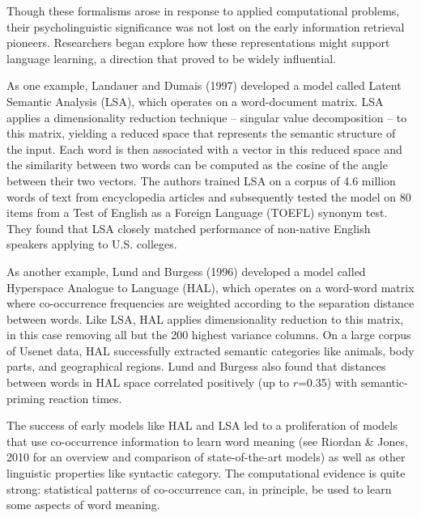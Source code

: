\documentclass[man,floatsintext]{apa6}
\begin{document}
Though these formalisms arose in response to applied computational problems, their psycholinguistic significance was not lost on the early information retrieval pioneers. Researchers began explore how these representations might support language learning, a direction that proved to be widely influential.

As one example, Landauer and Dumais (1997) developed a model called Latent Semantic Analysis (LSA), which operates on a word-document matrix. LSA applies a dimensionality reduction technique -- singular value decomposition -- to this matrix, yielding a reduced space that represents the semantic structure of the input. Each word is then associated with a vector in this reduced space and the similarity between two words can be computed as the cosine of the angle between their two vectors. The authors trained LSA on a corpus of 4.6 million words of text from encyclopedia articles and subsequently tested the model on 80 items from a Test of English as a Foreign Language (TOEFL) synonym test. They found that LSA closely matched performance of non-native English speakers applying to U.S. colleges. 

As another example, Lund and Burgess (1996) developed a model called Hyperspace Analogue to Language (HAL), which operates on a word-word matrix where co-occurrence frequencies are weighted according to the separation distance between words. Like LSA, HAL applies dimensionality reduction to this matrix, in this case removing all but the 200 highest variance columns. On a large corpus of Usenet data, HAL successfully extracted semantic categories like animals, body parts, and geographical regions. Lund and Burgess also found that distances between words in HAL space correlated positively (up to $r$=0.35) with semantic-priming reaction times.

The success of early models like HAL and LSA led to a proliferation of models that use co-occurrence information to learn word meaning (see Riordan \& Jones, 2010 for an overview and comparison of state-of-the-art models) as well as other linguistic properties like syntactic category. The computational evidence is quite strong: statistical patterns of co-occurrence can, in principle, be used to learn some aspects of word meaning.
\end{document}
